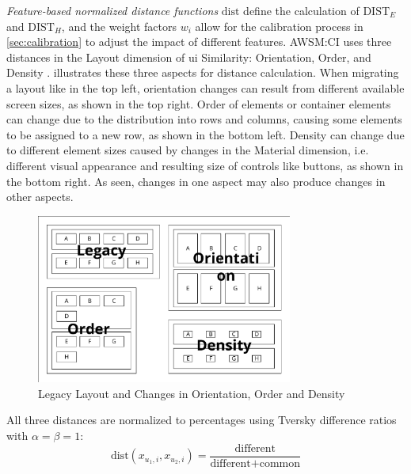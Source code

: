\emph{Feature-based normalized distance functions} \(\text{dist}\) define the calculation of \(\text{DIST}_E\) and \(\text{DIST}_H\), and the weight factors \(w_i\) allow for the calibration process in \cref{sec:calibration} to adjust the impact of different features.
AWSM:CI uses three distances in the Layout dimension of \gls{ui} Similarity: Orientation, Order, and Density \autocite{Heil2016Similarity}.
 illustrates these three aspects for distance calculation.
When migrating a \legacy layout like in the top left, orientation changes can result from different available screen sizes, as shown in the top right.
Order of elements or container elements can change due to the distribution into rows and columns, causing some elements to be assigned to a new row, as shown in the bottom left.
Density can change due to different element sizes caused by changes in the Material dimension, i.e. different visual appearance and resulting size of controls like buttons, as shown in the bottom right.
As seen, changes in one aspect may also produce changes in other aspects.

\begin{figure}[h!]
\hypertarget{fig:ci-dimensions}{%
\centering
\includegraphics[width=0.75\textwidth]{../figures/awsm-ci-similarity-dimensions.pdf}
\caption[Orientation, Order and Density Changes]{Legacy Layout and Changes in Orientation, Order and Density }\label{fig:ci-dimensions}
}
\end{figure}

All three distances are normalized to percentages using Tversky difference ratios with \(\alpha = \beta = 1\):
\begin{equation}\text{dist}(x_{u_1,i}, x_{u_2,i}) = \frac{\text{different}}{\text{different} + \text{common}}\label{eq:dist}\end{equation}

